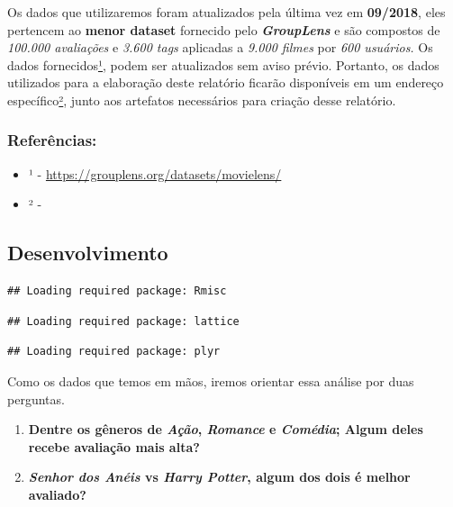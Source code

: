 \documentclass[]{article}
\providecommand{\tightlist}{%
  \setlength{\itemsep}{0pt}\setlength{\parskip}{0pt}}
\begin{document}
Os dados que utilizaremos foram atualizados pela última vez em
\textbf{09/2018}, eles pertencem ao \textbf{menor dataset} fornecido
pelo \textbf{\emph{GroupLens}} e são compostos de \emph{100.000
avaliações} e \emph{3.600 tags} aplicadas a \emph{9.000 filmes} por
\emph{600 usuários.} Os dados
fornecidos\href{https://grouplens.org/datasets/movielens/}{¹}, podem ser
atualizados sem aviso prévio. Portanto, os dados utilizados para a
elaboração deste relatório ficarão disponíveis em um endereço
específico\protect\hyperlink{data}{²}, junto aos artefatos necessários
para criação desse relatório.

\subsubsection{Referências:}\label{referuxeancias}

\begin{itemize}
\tightlist
\item
  ¹ - \url{https://grouplens.org/datasets/movielens/}
\item
  ² - 
\end{itemize}

\newpage

\subsection{Desenvolvimento}\label{desenvolvimento}

\begin{verbatim}
## Loading required package: Rmisc
\end{verbatim}

\begin{verbatim}
## Loading required package: lattice
\end{verbatim}

\begin{verbatim}
## Loading required package: plyr
\end{verbatim}

Como os dados que temos em mãos, iremos orientar essa análise por duas
perguntas.

\begin{enumerate}
\def\labelenumi{\arabic{enumi}.}
\tightlist
\item
  \textbf{Dentre os gêneros de \emph{Ação}, \emph{Romance} e
  \emph{Comédia}; Algum deles recebe avaliação mais alta?}
\item
  \textbf{\emph{Senhor dos Anéis} vs \emph{Harry Potter}, algum dos dois
  é melhor avaliado?}
\end{enumerate}
\end{document}
